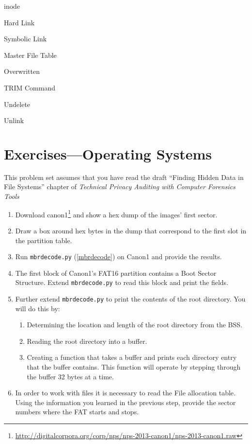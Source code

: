 inode

Hard Link

Symbolic Link

Master File Table

Overwritten

TRIM Command

Undelete

Unlink

\section{Exercises---Operating Systems}
This problem set assumes that you have read the draft ``Finding Hidden Data
in File Systems'' chapter of \emph{Technical Privacy Auditing with
  Computer Forensics Tools}

\begin{enumerate}
\item Download canon1\footnote{\url{http://digitalcorpora.org/corp/nps/nps-2013-canon1/nps-2013-canon1.raw}} and show a hex dump of the
  images' first sector.
\item Draw a box around hex bytes in the dump that
  correspond to the first slot in the partition table.
\item Run \texttt{mbrdecode.py} (\ref{mbrdecode}) on Canon1 and provide the results.
\item The first block of Canon1's FAT16 partition contains a Boot
  Sector Structure. Extend \texttt{mbrdecode.py} to read this block
  and print the fields. 
\item Further extend \texttt{mbrdecode.py} to print the contents of the root
  directory.  You will do this by:
\begin{enumerate}
  \item Determining the location and length of the root directory
    from the BSS.
  \item Reading the root directory into a buffer.
  \item Creating a function that takes a buffer and prints each
    directory entry that the buffer contains.  This function will
    operate by stepping through the buffer 32 bytes at a time.
\end{enumerate}  

\item In order to work with files it is necessary to read the File
  allocation table. Using the information you learned in the previous
  step, provide the sector numbers where the FAT starts and stops.
\end{enumerate}

